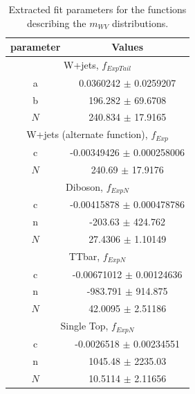 \begin{table}[h!]
	\centering
	\begin{tabular}{||c | c||} 
	 \hline
	 parameter & Values \\
	 \hline \hline
	 \multicolumn{2}{|c|}{W+jets, $f_{ExpTail}$}\\
	 \hline
	 a 			&	0.0360242 $\pm$ 0.0259207\\
	 b 			&	196.282	$\pm$ 69.6708\\
	 $N$ 		&	240.834 $\pm$ 17.9165\\
	 \hline \hline
	 \multicolumn{2}{|c|}{W+jets (alternate function), $f_{Exp}$}\\
	 \hline
	 c 			&	-0.00349426 $\pm$ 0.000258006\\
	 $N$ 		&	240.69 $\pm$ 17.9176\\
	 \hline \hline
	 \multicolumn{2}{|c|}{Diboson, $f_{ExpN}$}\\
	 \hline
	 c 			&	-0.00415878 $\pm$ 0.000478786\\
	 n 			&	-203.63 $\pm$ 424.762\\
	 $N$ 		&	27.4306 $\pm$ 1.10149\\
	 \hline \hline
	 \multicolumn{2}{|c|}{TTbar, $f_{ExpN}$}\\
	 \hline
	 c 			&	-0.00671012 $\pm$ 0.00124636\\
	 n 			&	-983.791 $\pm$ 914.875\\
	 $N$ 		&	42.0095 $\pm$ 2.51186\\
	 \hline \hline
	 \multicolumn{2}{|c|}{Single Top, $f_{ExpN}$}\\
	 \hline
	 c 			&	-0.0026518 $\pm$ 0.00234551\\
	 n 			&	1045.48 $\pm$ 2235.03\\
	 $N$ 		&	10.5114 $\pm$ 2.11656\\
	 \hline \hline
	\end{tabular}
 	\caption{Extracted fit parameters for the functions describing the $m_{WV}$ distributions.}
 	\label{Table:BackgroundEstimation_mWWFitPars}
\end{table}


